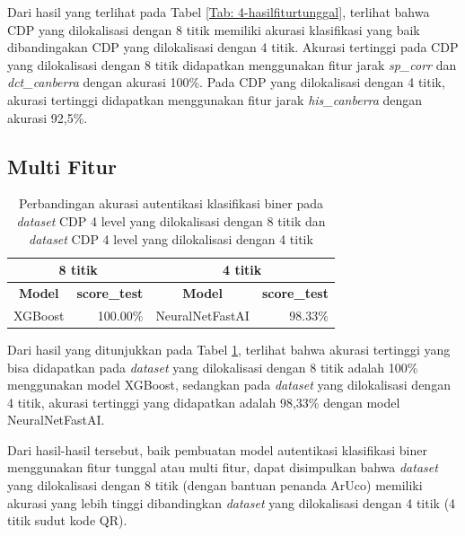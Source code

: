 Dari hasil yang terlihat pada Tabel \ref{Tab: 4-hasilfiturtunggal}, terlihat bahwa CDP yang dilokalisasi dengan 8 titik memiliki akurasi klasifikasi yang baik
dibandingakan CDP yang dilokalisasi dengan 4 titik. Akurasi tertinggi pada CDP yang dilokalisasi dengan 8 titik didapatkan menggunakan fitur jarak
\emph{sp\_corr} dan \emph{dct\_canberra} dengan akurasi 100\%. Pada CDP yang dilokalisasi dengan 4 titik, akurasi tertinggi didapatkan menggunakan fitur jarak
\emph{his\_canberra} dengan akurasi 92,5\%.

\clearpage

\subsection{Multi Fitur}
\begin{table}[!ht]
	\centering
	\caption{Perbandingan akurasi autentikasi klasifikasi biner pada \emph{dataset} CDP 4 level yang dilokalisasi dengan 8 titik dan \emph{dataset} CDP 4 level yang dilokalisasi dengan 4 titik}
	\vspace{0.5em}
	\begin{tabular}{|cc|cc|}
		\hline
		\multicolumn{2}{|c|}{\textbf{8 titik}} & \multicolumn{2}{c|}{\textbf{4 titik}}                                                                       \\ \hline
		\multicolumn{1}{|c|}{\textbf{Model}}   & \textbf{score\_test}                  & \multicolumn{1}{c|}{\textbf{Model}}  & \textbf{score\_test}         \\ \hline
		\multicolumn{1}{|l|}{XGBoost}          & \multicolumn{1}{r|}{100.00\%}         & \multicolumn{1}{l|}{NeuralNetFastAI} & \multicolumn{1}{r|}{98.33\%} \\ \hline
	\end{tabular}
	\label{Tab: 4-hasilmulti8vs4titik}
\end{table}

Dari hasil yang ditunjukkan pada Tabel \ref{Tab: 4-hasilmulti8vs4titik}, terlihat bahwa akurasi tertinggi yang bisa didapatkan pada \emph{dataset} yang
dilokalisasi dengan 8 titik adalah 100\% menggunakan model XGBoost, sedangkan pada \emph{dataset} yang dilokalisasi dengan 4 titik, akurasi tertinggi yang
didapatkan adalah 98,33\% dengan model NeuralNetFastAI.

Dari hasil-hasil tersebut, baik pembuatan model autentikasi klasifikasi biner menggunakan fitur tunggal atau multi fitur, dapat disimpulkan bahwa
\emph{dataset} yang dilokalisasi dengan 8 titik (dengan bantuan penanda ArUco) memiliki akurasi yang lebih tinggi dibandingkan \emph{dataset} yang dilokalisasi
dengan 4 titik (4 titik sudut kode QR).


